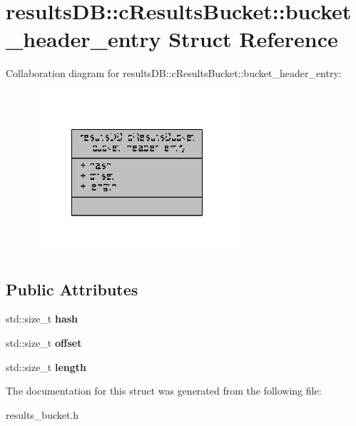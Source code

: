 \hypertarget{structresultsDB_1_1cResultsBucket_1_1bucket__header__entry}{\section{results\-D\-B\-:\-:c\-Results\-Bucket\-:\-:bucket\-\_\-header\-\_\-entry Struct Reference}
\label{structresultsDB_1_1cResultsBucket_1_1bucket__header__entry}
}


Collaboration diagram for results\-D\-B\-:\-:c\-Results\-Bucket\-:\-:bucket\-\_\-header\-\_\-entry\-:
\nopagebreak
\begin{figure}[H]
\begin{center}
\leavevmode
\includegraphics[width=216pt]{structresultsDB_1_1cResultsBucket_1_1bucket__header__entry__coll__graph}
\end{center}
\end{figure}
\subsection*{Public Attributes}
\begin{DoxyCompactItemize}
\item 
\hypertarget{structresultsDB_1_1cResultsBucket_1_1bucket__header__entry_a48df72fc3d9c61a12e34a6f54c52c91b}{std\-::size\-\_\-t {\bfseries hash}}\label{structresultsDB_1_1cResultsBucket_1_1bucket__header__entry_a48df72fc3d9c61a12e34a6f54c52c91b}

\item 
\hypertarget{structresultsDB_1_1cResultsBucket_1_1bucket__header__entry_a431f966e0ae4999cbebda38f49abcb23}{std\-::size\-\_\-t {\bfseries offset}}\label{structresultsDB_1_1cResultsBucket_1_1bucket__header__entry_a431f966e0ae4999cbebda38f49abcb23}

\item 
\hypertarget{structresultsDB_1_1cResultsBucket_1_1bucket__header__entry_aa353295a8dd03e63f4b9b67c856ff235}{std\-::size\-\_\-t {\bfseries length}}\label{structresultsDB_1_1cResultsBucket_1_1bucket__header__entry_aa353295a8dd03e63f4b9b67c856ff235}

\end{DoxyCompactItemize}


The documentation for this struct was generated from the following file\-:\begin{DoxyCompactItemize}
\item 
results\-\_\-bucket.\-h\end{DoxyCompactItemize}
